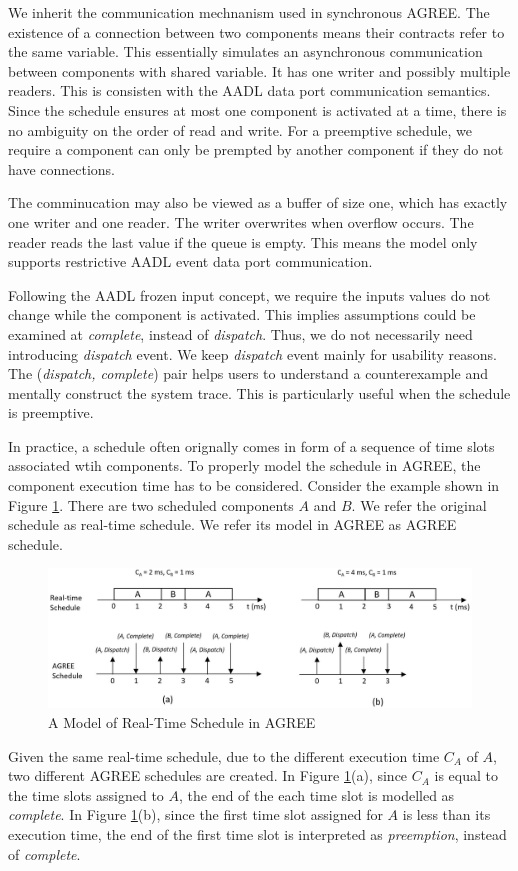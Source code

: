 We inherit the communication mechnanism used in synchronous AGREE. The existence of a connection between two components means their contracts refer to the same variable. 
This essentially simulates an asynchronous communication between components with shared variable. It has one writer and possibly multiple readers. This is consisten with the AADL data port communication semantics.
Since the schedule ensures at most one component is activated at a time, there is no ambiguity on the order of read and write. For a preemptive schedule, we require a component can only be prempted by another component if they do not have connections.

The comminucation may also be viewed as a buffer of size one, which has exactly one writer and one reader. The writer overwrites when overflow occurs. The reader reads the last value if the queue is empty. This means the model only supports restrictive AADL event data port communication.

Following the AADL frozen input concept, we require the inputs values do not change while the component is activated. This implies assumptions could be examined at \emph{complete}, instead of \emph{dispatch}. Thus, we do not necessarily need introducing \emph{dispatch} event. We keep \emph{dispatch} event mainly for usability reasons. The (\emph{dispatch, complete}) pair helps users to understand a counterexample and mentally construct the system trace. This is particularly useful when the schedule is preemptive.

In practice, a schedule often orignally comes in form of a sequence of time slots associated wtih components. 
To properly model the schedule in AGREE, the component execution time has to be considered. Consider the example shown in Figure \ref{RTschedule}. There are two scheduled components $A$ and $B$. We refer the original schedule as real-time schedule. We refer its model in AGREE as AGREE schedule.
\begin{figure}[ht!]
\centering
\includegraphics[width=130mm]{RTschedule.jpg}
\caption{A Model of Real-Time Schedule in AGREE\label{RTschedule}}
\end{figure}
Given the same real-time schedule, due to the different execution time $C_A$ of $A$, two different AGREE schedules are created. In Figure \ref{RTschedule}(a), since $C_A$ is equal to the time slots assigned to $A$, the end of the each time slot is modelled as \emph{complete}. In Figure \ref{RTschedule}(b), since the first time slot assigned for $A$ is less than its execution time, the end of the first time slot is interpreted as \emph{preemption}, instead of \emph{complete}.

